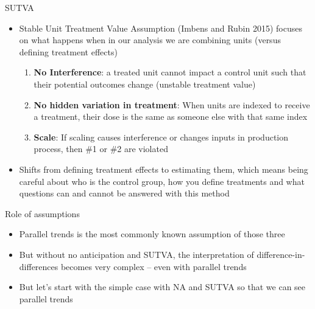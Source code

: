 \documentclass{beamer}
\begin{document}
\begin{frame}{SUTVA}

\begin{itemize}
\item Stable Unit Treatment Value Assumption (Imbens and Rubin 2015) focuses on what happens when in our analysis we are combining units (versus defining treatment effects)
	\begin{enumerate}
	\item \textbf{No Interference}: a treated unit cannot impact a control unit such that their potential outcomes change (unstable treatment value)
	\item \textbf{No hidden variation in treatment}: When units are indexed to receive a treatment, their dose is the same as someone else with that same index
	\item \textbf{Scale}: If scaling causes interference or changes inputs in production process, then \#1 or \#2 are violated
	\end{enumerate}
\item Shifts from defining treatment effects to estimating them, which means being careful about who is the control group, how you define treatments and what questions can and cannot be answered with this method
\end{itemize}

\end{frame}


\begin{frame}{Role of assumptions}

\begin{itemize}
\item Parallel trends is the most commonly known assumption of those three
\item But without no anticipation and SUTVA, the interpretation of difference-in-differences becomes very complex -- even with parallel trends
\item But let's start with the simple case with NA and SUTVA so that we can see parallel trends

\end{itemize}

\end{frame}
\end{document}

